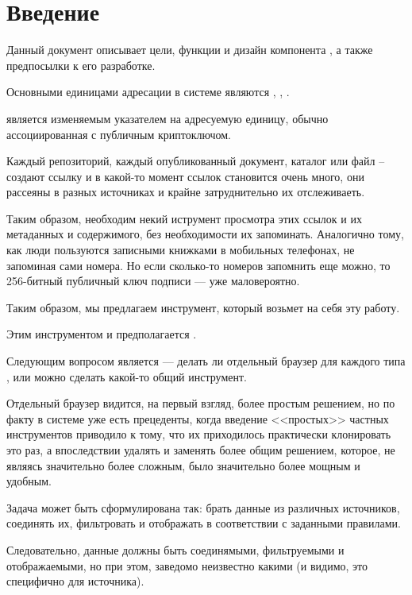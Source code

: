 
\chapter{Введение}

Данный документ описывает цели, функции и дизайн компонента ,
а также предпосылки к его разработке.

Основными единицами адресации в системе являются
,  , .

 является изменяемым указателем на адресуемую единицу, обычно
ассоциированная с публичным криптоключом.

Каждый репозиторий, каждый опубликованный документ, каталог или файл -- создают
ссылку и в какой-то момент ссылок становится очень много, они рассеяны в разных
источниках и крайне затруднительно их отслеживаеть.

Таким образом, необходим некий иструмент просмотра этих ссылок и их метаданных
и содержимого, без необходимости их запоминать. Аналогично тому,  как люди пользуются
записными книжками в мобильных телефонах, не запоминая сами номера. Но если сколько-то
номеров запомнить еще можно, то 256-битный публичный ключ подписи --- уже маловероятно.

Таким образом, мы предлагаем инструмент, который возьмет на себя эту работу.

Этим инструментом и предполагается .

Следующим вопросом является --- делать ли отдельный браузер для каждого типа
, или можно сделать какой-то общий инструмент.

Отдельный браузер видится, на первый взгляд, более простым решением, но по факту в системе уже есть
прецеденты, когда введение <<простых>> частных инструментов приводило к тому, что их приходилось
практически клонировать это раз, а впоследствии удалять и заменять более общим решением, которое, не
являясь значительно более сложным, было значительно более мощным и удобным.

Задача  может быть сформулирована так: брать данные из различных
источников, соединять их, фильтровать и отображать в соответствии с заданными правилами.

Следовательно, данные должны быть соединямыми, фильтруемыми и отображаемыми, но при этом,
заведомо неизвестно какими (и видимо, это специфично для источника).

